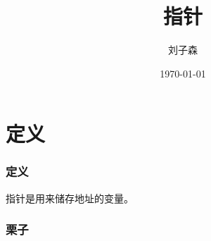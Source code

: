 \documentclass{beamer}
\author{刘子森}
\title{指针}
\date{\today}
\institute{四川大学软件学院}
\begin{document}
\titlepage

\begin{frame}
 \tableofcontents
\end{frame}

\section{定义}

\begin{frame}
 \frametitle{定义}
 指针是用来储存地址的变量。
\end{frame}

\begin{frame}
 \frametitle{栗子}
 
\end{frame}
\end{document}
